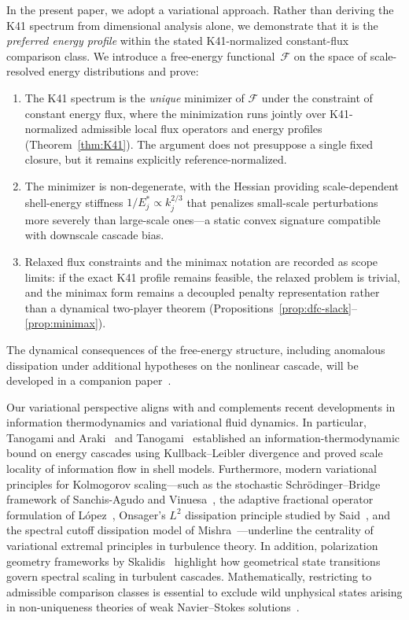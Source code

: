 \documentclass[12pt,a4paper]{article}
\theoremstyle{definition}
\theoremstyle{plain}
\theoremstyle{remark}
\begin{document}
In the present paper, we adopt a variational approach. Rather than deriving the
K41 spectrum from dimensional analysis alone, we demonstrate that it is the
\emph{preferred energy profile} within the stated K41-normalized
constant-flux comparison class.
We introduce a free-energy functional~$\mathcal{F}$ on the space of
scale-resolved energy distributions and prove:
\begin{enumerate}
  \item The K41 spectrum is the \emph{unique} minimizer of $\mathcal{F}$
        under the constraint of constant energy flux, where the minimization
        runs jointly over K41-normalized admissible local flux operators and
        energy profiles (Theorem~\ref{thm:K41}).  The argument does not
        presuppose a single fixed closure, but it remains explicitly
        reference-normalized.
  \item The minimizer is non-degenerate, with the Hessian providing
        scale-dependent shell-energy stiffness $1/E_j^* \propto k_j^{2/3}$ that
        penalizes small-scale perturbations more severely than large-scale
        ones---a static convex signature compatible with downscale cascade
        bias.
  \item Relaxed flux constraints and the minimax notation are recorded as
        scope limits: if the exact K41 profile remains feasible, the
        relaxed problem is trivial, and the minimax form remains a decoupled
        penalty representation rather than a dynamical two-player theorem
        (Propositions~\ref{prop:dfc-slack}--\ref{prop:minimax}).
\end{enumerate}
The dynamical consequences of the free-energy structure, including
anomalous dissipation under additional hypotheses on the nonlinear
cascade, will be developed in a companion paper~\cite{Geiger2026b}.

Our variational perspective aligns with and complements recent developments in information thermodynamics and variational fluid dynamics. In particular, Tanogami and Araki~\cite{Tanogami2023} and Tanogami~\cite{Tanogami2025} established an information-thermodynamic bound on energy cascades using Kullback--Leibler divergence and proved scale locality of information flow in shell models. Furthermore, modern variational principles for Kolmogorov scaling---such as the stochastic Schrödinger--Bridge framework of Sanchis-Agudo and Vinuesa~\cite{SanchisAgudoVinuesa2025}, the adaptive fractional operator formulation of López~\cite{Lopez2026}, Onsager's $L^2$ dissipation principle studied by Said~\cite{Said2025}, and the spectral cutoff dissipation model of Mishra~\cite{Mishra2026}---underline the centrality of variational extremal principles in turbulence theory. In addition, polarization geometry frameworks by Skalidis~\cite{Skalidis2026} highlight how geometrical state transitions govern spectral scaling in turbulent cascades. Mathematically, restricting to admissible comparison classes is essential to exclude wild unphysical states arising in non-uniqueness theories of weak Navier--Stokes solutions~\cite{BuckmasterVicol2019,Isett2018}.
\end{document}
